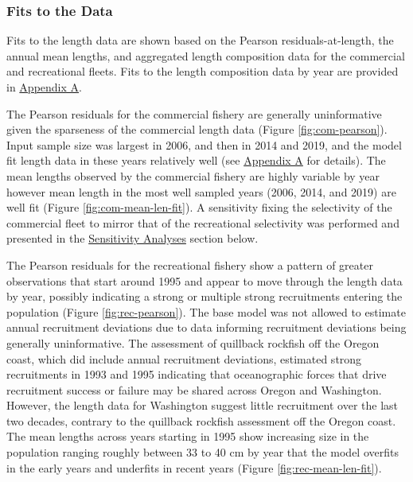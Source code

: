 \documentclass[11pt,
  english,
  a4paper,
]{article}
\begin{document}
\hypertarget{fits-to-the-data}{%
\subsubsection{Fits to the Data}\label{fits-to-the-data}}

\leavevmode\tagmcend\tagstructend


Fits to the length data are shown based on the Pearson residuals-at-length, the annual mean lengths, and aggregated length composition data for the commercial and recreational fleets. Fits to the length composition data by year are provided in {\protect\hyperlink{append_a}{Appendix A}\leavevmode\tagmcend\tagstructend}.

\leavevmode\tagmcend\tagstructend\par


The Pearson residuals for the commercial fishery are generally uninformative given the sparseness of the commercial length data (Figure \ref{fig:com-pearson}). Input sample size was largest in 2006, and then in 2014 and 2019, and the model fit length data in these years relatively well (see {\protect\hyperlink{append_a}{Appendix A}\leavevmode\tagmcend\tagstructend} for details). The mean lengths observed by the commercial fishery are highly variable by year however mean length in the most well sampled years (2006, 2014, and 2019) are well fit (Figure \ref{fig:com-mean-len-fit}). A sensitivity fixing the selectivity of the commercial fleet to mirror that of the recreational selectivity was performed and presented in the {\protect\hyperlink{sensitivity-analyses}{Sensitivity Analyses}\leavevmode\tagmcend\tagstructend} section below.

\leavevmode\tagmcend\tagstructend\par


The Pearson residuals for the recreational fishery show a pattern of greater observations that start around 1995 and appear to move through the length data by year, possibly indicating a strong or multiple strong recruitments entering the population (Figure \ref{fig:rec-pearson}). The base model was not allowed to estimate annual recruitment deviations due to data informing recruitment deviations being generally uninformative. The assessment of quillback rockfish off the Oregon coast, which did include annual recruitment deviations, estimated strong recruitments in 1993 and 1995 indicating that oceanographic forces that drive recruitment success or failure may be shared across Oregon and Washington. However, the length data for Washington suggest little recruitment over the last two decades, contrary to the quillback rockfish assessment off the Oregon coast. The mean lengths across years starting in 1995 show increasing size in the population ranging roughly between 33 to 40 cm by year that the model overfits in the early years and underfits in recent years (Figure \ref{fig:rec-mean-len-fit}).
\end{document}
